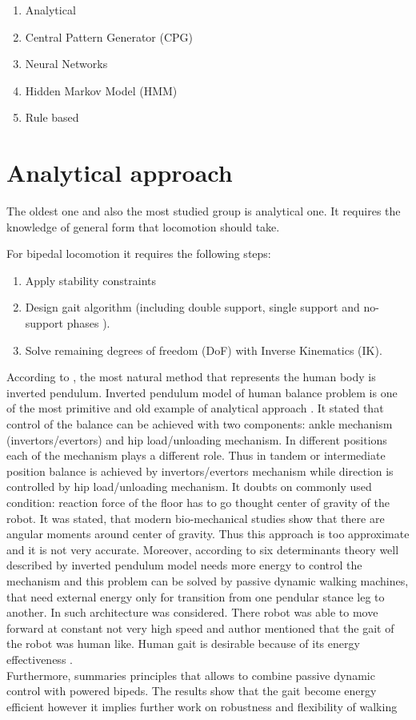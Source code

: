 \documentclass[11pt,a4paper]{report}
\begin{document}
		\begin{enumerate}
			\item Analytical
			\item Central Pattern Generator (CPG)
			\item Neural Networks
			\item Hidden Markov Model (HMM)
			\item Rule based
		\end{enumerate}

		\section{Analytical approach}
		The oldest one and also the most studied group is analytical one. It requires the knowledge of general form that locomotion should take.

		For bipedal locomotion it requires the following steps:
		\begin{enumerate}
			\item Apply stability constraints
			\item Design gait algorithm (including double support, single support and no-support phases \cite{wright2014intelligent}).
			\item Solve remaining degrees of freedom (DoF) with Inverse Kinematics (IK).
		\end{enumerate}

		According to \cite{tang2008analysis}, the most natural method that represents the human body is inverted pendulum.
		Inverted pendulum model of human balance problem is one of the most primitive and old example of analytical approach \cite{winter1995human}. It stated that control of the balance can be achieved with two components: ankle mechanism (invertors/evertors) and hip load/unloading mechanism. In different positions each of the mechanism plays a different role. Thus in tandem or intermediate position balance is achieved by invertors/evertors mechanism while direction is controlled by hip load/unloading mechanism. It doubts on commonly used condition: reaction force of the floor has to go thought center of gravity of the robot. It was stated, that modern bio-mechanical studies show that there are angular moments around center of gravity. 
		Thus this approach is too approximate and it is not very accurate.
		Moreover, according to \cite{kuo2007six} six determinants theory\cite{inman1953major} well described by inverted pendulum model needs more energy to control the mechanism and this problem can be solved by passive dynamic walking machines, that need external energy only for transition from one pendular stance leg to another. In \cite{collins2005bipedal} such architecture was considered. There robot was able to move forward at constant not very high speed and author mentioned that the gait of the robot was human like. Human gait is desirable because of its energy effectiveness \cite{golliday1977approach}.\\
		Furthermore, \cite{anderson2005powered} summaries principles that allows to combine passive dynamic control with powered bipeds. The results show that the gait become energy efficient however it implies further work on robustness and flexibility of walking\\
\end{document}
